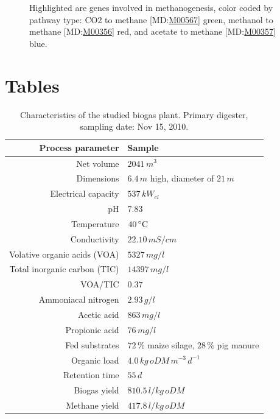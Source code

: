 \documentclass{bmcart}
\begin{document}
\begin{backmatter}
\begin{figure}[h!]
\caption{ Highlighted are genes involved in methanogenesis, color coded by pathway type: CO2 to methane [MD:\href{http://www.kegg.jp/kegg-bin/show_module?M00567}{M00567}] green, methanol to methane [MD:\href{http://www.kegg.jp/kegg-bin/show_module?M00356}{M00356}] red, and acetate to methane [MD:\href{http://www.kegg.jp/kegg-bin/show_module?M00357}{M00357}] blue.}
\label{fCoverage}
\end{figure}



\section*{Tables}
\begin{table}[h!]
\caption{Characteristics of the studied biogas plant. Primary digester, sampling date: Nov 15, 2010.}
\begin{tabular}{rl}
\hline
Process parameter & Sample\\
\hline
Net volume & $2041\,m^{3}$\\
Dimensions & $6.4\,m$ high, diameter of $21\,m$\\
Electrical capacity & $537\,kW_{el}$\\
\hline
pH & $7.83$\\
Temperature & $40\,^{\circ}{\rm C}$\\
Conductivity & $22.10\,mS/cm$\\
Volative organic acids (VOA) & $5327\,mg/l$\\
Total inorganic carbon (TIC) & $14397\,mg/l$\\
VOA/TIC & $0.37$\\
Ammoniacal nitrogen & $2.93\,g/l$\\
Acetic acid & $863\,mg/l$\\
Propionic acid & $76\,mg/l$\\
\hline
Fed substrates & $72\,\%$ maize silage, $28\,\%$ pig manure\\
Organic load & $4.0\,kg\,oDM\,m^{-3}\,d^{-1}$\\
Retention time & $55\,d$\\
Biogas yield & $810.5\,l/kg\,oDM$\\
Methane yield & $417.8\,l/kg\,oDM$\\
\hline
\end{tabular}
\label{tBiogasPlant}
\end{table}


\end{backmatter}
\end{document}
